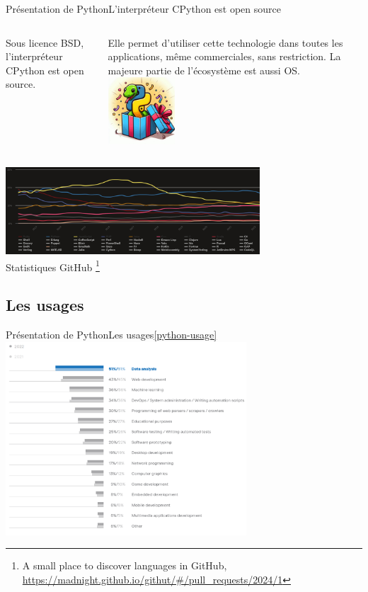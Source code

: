 \documentclass{beamer}
\begin{document}
    \begin{frame}{Présentation de Python}{L'interpréteur CPython est open source}
        \begin{columns}
            Sous licence BSD, l'interpréteur CPython est open source.

            Elle permet d'utiliser cette technologie dans toutes les applications, même commerciales, sans restriction.
            \bigbreak
            La majeure partie de l'écosystème est aussi OS.
            \centering
            \includegraphics[width=2.5cm]{image/python-gift}
        \end{columns}
        \bigbreak
        \centering
        \includegraphics[width=9.5cm]{image/github-stats} \\ Statistiques GitHub \footnote{A small place to discover languages in GitHub, \url{https://madnight.github.io/githut/\#/pull_requests/2024/1}} \\
    \end{frame}

    \subsection{Les usages}\label{subsec:usages}

    \begin{frame}{Présentation de Python}{Les usages\cref{python-usage}}
        \centering
        \includegraphics[width=9cm]{image/survey-usage}
    \end{frame}
\end{document}
